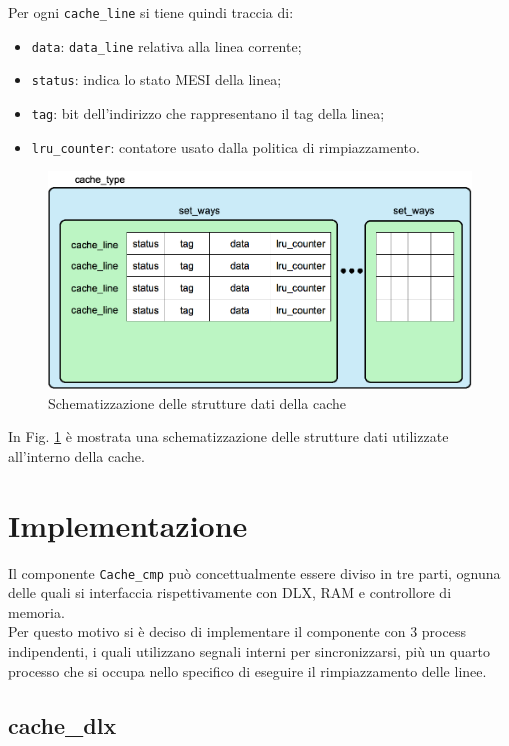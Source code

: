 Per ogni \texttt{cache\_line} si tiene quindi traccia di:
\begin{itemize}
  \item \texttt{data}: \texttt{data\_line} relativa alla linea corrente;
  \item \texttt{status}: indica lo stato MESI della linea;
  \item \texttt{tag}: bit dell'indirizzo che rappresentano il tag della linea;
  \item \texttt{lru\_counter}: contatore usato dalla politica di rimpiazzamento.
\end{itemize}


\begin{figure}[h!]
\centering
\includegraphics[width=\textwidth]{img/cacheType.png}
\caption{Schematizzazione delle strutture dati della cache}
\label{fig:c_type}
\end{figure}

In Fig. \ref{fig:c_type} \`e mostrata una schematizzazione delle strutture dati utilizzate all'interno della cache.

\section{Implementazione}

Il componente \texttt{Cache\_cmp} pu\`o concettualmente essere diviso in tre parti, ognuna delle quali si interfaccia rispettivamente con DLX, RAM e controllore di memoria.\\
Per questo motivo si \`e deciso di implementare il componente con 3 process indipendenti, i quali utilizzano segnali interni per sincronizzarsi, pi\`u un quarto processo che si occupa nello specifico di eseguire il rimpiazzamento delle linee.\\

\subsection{cache\_dlx}

